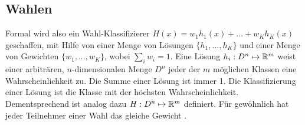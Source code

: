 \subsection{Wahlen}
\label{sec:wahlklassifizierer}
Formal wird also ein \glqq Wahl\grqq-Klassifizierer $H(x) = w_1 h_1(x) + ... + w_K h_K(x)$ geschaffen, mit Hilfe von einer Menge von Lösungen $\{h_1, ..., h_K\}$ und einer Menge von Gewichten $\{w_1, ..., w_K\}$, wobei
$\sum_i w_i = 1$. Eine Lösung $h_i: D^n \mapsto {\mathbb R}^m$ weist einer arbiträren, $n$-dimensionalen Menge $D^n$ jeder der $m$ möglichen Klassen eine Wahrscheinlichkeit zu.
Die Summe einer Lösung ist immer 1. Die Klassifizierung einer Lösung ist die Klasse mit der höchsten Wahrscheinlichkeit. Dementsprechend ist analog dazu $H: D^n \mapsto {\mathbb R}^m$ definiert.
Für gewöhnlich hat jeder Teilnehmer einer Wahl das gleiche Gewicht \cite{dietterich2002ensemble}.
